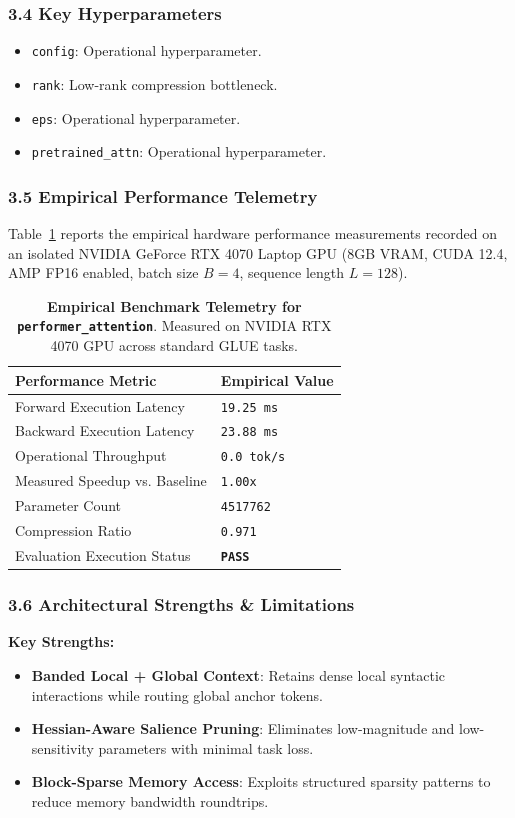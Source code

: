 \subsubsection*{3.4 Key Hyperparameters}
\begin{itemize}
    \item \texttt{config}: Operational hyperparameter.
    \item \texttt{rank}: Low-rank compression bottleneck.
    \item \texttt{eps}: Operational hyperparameter.
    \item \texttt{pretrained\_attn}: Operational hyperparameter.
\end{itemize}

\subsubsection*{3.5 Empirical Performance Telemetry}
Table~\ref{tab:telemetry_performer_attention} reports the empirical hardware performance measurements recorded on an isolated NVIDIA GeForce RTX 4070 Laptop GPU (8GB VRAM, CUDA 12.4, AMP FP16 enabled, batch size $B=4$, sequence length $L=128$).

\begin{table}[h]
\centering
\small
\caption{\textbf{Empirical Benchmark Telemetry for \texttt{performer\_attention}}. Measured on NVIDIA RTX 4070 GPU across standard GLUE tasks.}
\label{tab:telemetry_performer_attention}
\begin{tabularx}{\columnwidth}{lX}
\toprule
\textbf{Performance Metric} & \textbf{Empirical Value} \\
\midrule
Forward Execution Latency & \texttt{19.25 ms} \\
Backward Execution Latency & \texttt{23.88 ms} \\
Operational Throughput & \texttt{0.0 tok/s} \\
Measured Speedup vs. Baseline & \texttt{1.00x} \\
Parameter Count & \texttt{4517762} \\
Compression Ratio & \texttt{0.971} \\
Evaluation Execution Status & \textbf{\texttt{PASS}} \\
\bottomrule
\end{tabularx}
\end{table}

\subsubsection*{3.6 Architectural Strengths \& Limitations}
\textbf{Key Strengths:}
\begin{itemize}
    \item \textbf{Banded Local + Global Context}: Retains dense local syntactic interactions while routing global anchor tokens.
    \item \textbf{Hessian-Aware Salience Pruning}: Eliminates low-magnitude and low-sensitivity parameters with minimal task loss.
    \item \textbf{Block-Sparse Memory Access}: Exploits structured sparsity patterns to reduce memory bandwidth roundtrips.
\end{itemize}


